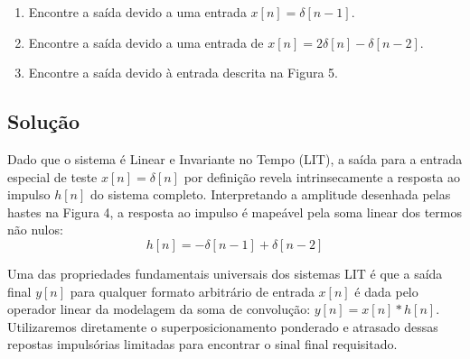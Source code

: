 \documentclass[tcc]{classe_uftex/uftex}
\begin{document}
\begin{enumerate}
    \item[\textbf{a)}] Encontre a saída devido a uma entrada $x[n]= \delta[n-1]$.
    \item[\textbf{b)}] Encontre a saída devido a uma entrada de $x[n]=2\delta[n]- \delta[n-2]$.
    \item[\textbf{c)}] Encontre a saída devido à entrada descrita na Figura 5.
\end{enumerate}

\subsection*{Solução}

Dado que o sistema é Linear e Invariante no Tempo (LIT), a saída para a entrada especial de teste $x[n] = \delta[n]$ por definição revela intrinsecamente a resposta ao impulso $h[n]$ do sistema completo. Interpretando a amplitude desenhada pelas hastes na Figura 4, a resposta ao impulso é mapeável pela soma linear dos termos não nulos:
\begin{equation}
    h[n] = -\delta[n-1] + \delta[n-2]
\end{equation}

Uma das propriedades fundamentais universais dos sistemas LIT é que a saída final $y[n]$ para qualquer formato arbitrário de entrada $x[n]$ é dada pelo operador linear da modelagem da soma de convolução: $y[n] = x[n] * h[n]$. Utilizaremos diretamente o superposicionamento ponderado e atrasado dessas repostas impulsórias limitadas para encontrar o sinal final requisitado.
\end{document}
